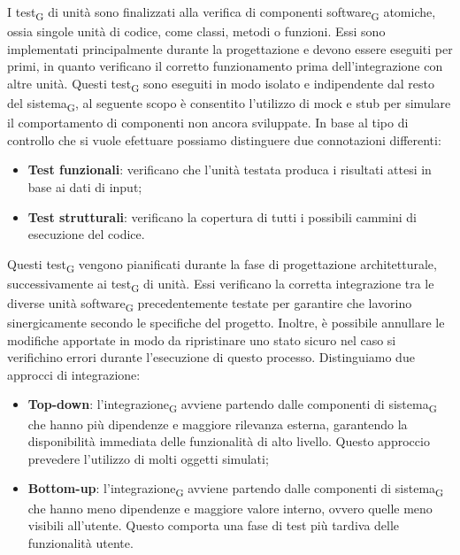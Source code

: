 I {test\textsubscript{G}} di unità sono finalizzati alla verifica di componenti {software\textsubscript{G}}
atomiche, ossia singole unità di codice, come classi, metodi o funzioni. Essi sono implementati principalmente durante la progettazione e
devono essere eseguiti per primi, in quanto verificano il corretto funzionamento prima dell'integrazione con altre unità. Questi
{test\textsubscript{G}} sono eseguiti in modo isolato e indipendente dal resto del {sistema\textsubscript{G}},
al seguente scopo è consentito l'utilizzo di mock e stub per simulare il comportamento di componenti non ancora sviluppate. In base al tipo
di controllo che si vuole efettuare possiamo distinguere due connotazioni differenti:
\begin{itemize}
    \item \textbf{Test funzionali}: verificano che l'unità testata produca i risultati attesi in base ai dati di input;
    \item \textbf{Test strutturali}: verificano la copertura di tutti i possibili cammini di esecuzione del codice.
\end{itemize}

Questi {test\textsubscript{G}} vengono pianificati durante la fase di progettazione architetturale, successivamente ai 
{test\textsubscript{G}} di unità. Essi verificano la corretta integrazione tra le diverse unità {software\textsubscript{G}}
precedentemente testate per garantire che lavorino sinergicamente secondo le specifiche del progetto. Inoltre, è possibile annullare le modifiche
apportate in modo da ripristinare uno stato sicuro nel caso si verifichino errori durante l'esecuzione di questo processo. Distinguiamo
due approcci di integrazione:
\begin{itemize}
    \item \textbf{Top-down}: l'{integrazione\textsubscript{G}} avviene partendo dalle componenti di {sistema\textsubscript{G}}
        che hanno più dipendenze e maggiore rilevanza esterna, garantendo la disponibilità immediata delle funzionalità di alto livello.
        Questo approccio prevedere l'utilizzo di molti oggetti simulati;
    \item \textbf{Bottom-up}: l'{integrazione\textsubscript{G}} avviene partendo dalle componenti di {sistema\textsubscript{G}}
        che hanno meno dipendenze e maggiore valore interno, ovvero quelle meno visibili all'utente. Questo comporta una fase di test più tardiva
        delle funzionalità utente.
\end{itemize}

